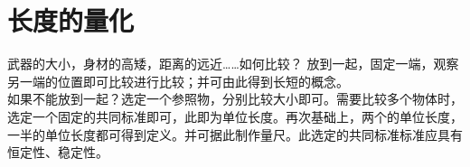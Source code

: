   \section{长度的量化}武器的大小，身材的高矮，距离的远近……如何比较？
    放到一起，固定一端，观察另一端的位置即可比较进行比较；并可由此得到长短的概念。\\
    如果不能放到一起？选定一个参照物，分别比较大小即可。需要比较多个物体时，选定一个固定的共同标准即可，此即为单位长度。再次基础上，两个的单位长度，一半的单位长度都可得到定义。并可据此制作量尺。此选定的共同标准标准应具有恒定性、稳定性。\\
